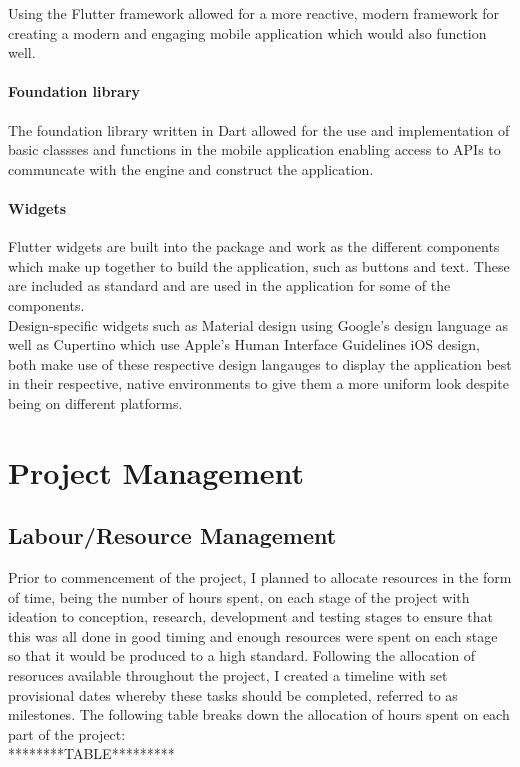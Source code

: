 \documentclass{report}
\begin{document}
Using the Flutter framework allowed for a more reactive, modern framework for creating a modern and engaging mobile application which would also function well.

		\subsubsection{Foundation library}
The foundation library written in Dart allowed for the use and implementation of basic classses and functions in the mobile application enabling access to APIs to communcate with the engine and construct the application.

		\subsubsection{Widgets}
Flutter widgets are built into the package and work as the different components which make up together to build the application, such as buttons and text. These are included as standard and are used in the application for some of the components.\\

Design-specific widgets such as Material design using Google's design language as well as Cupertino which use Apple's Human Interface Guidelines iOS design, both make use of these respective design langauges to display the application best in their respective, native environments to give them a more uniform look despite being on different platforms.

\chapter{Project Management}

	\section{Labour/Resource Management}
Prior to commencement of the project, I planned to allocate resources in the form of time, being the number of hours spent, on each stage of the project with ideation to conception, research, development and testing stages to ensure that this was all done in good timing and enough resources were spent on each stage so that it would be produced to a high standard. Following the allocation of resoruces available throughout the project, I created a timeline with set provisional dates whereby these tasks should be completed, referred to as milestones. The following table breaks down the allocation of hours spent on each part of the project:\\
********TABLE*********
\end{document}
